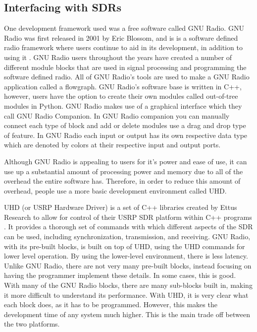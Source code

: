 \subsection{Interfacing with SDRs}
One development framework used was a free software called GNU Radio.  GNU Radio was first released in 2001 by Eric Blossom, and is is a software defined radio framework where users continue to aid in its development, in addition to using it \cite{GNURadioHistory}.
GNU Radio users throughout the years have created a number of different module blocks that are used in signal processing and programming the software defined radio.  All of GNU Radio’s tools are used to make a GNU Radio application called a flowgraph. GNU Radio’s software base is written in C++, however, users have the option to create their own modules called out-of-tree modules in Python.  GNU Radio makes use of a graphical interface which they call GNU Radio Companion.  In GNU Radio companion you can manually connect each type of block and add or delete modules use a drag and drop type of feature.  In GNU Radio each input or output has its own respective data type which are denoted by colors at their respective input and output ports. \par

Although GNU Radio is appealing to users for it's power and ease of use, it can use up a substantial amount of processing power and memory due to all of the overhead the entire software has.  Therefore, in order to reduce this amount of overhead, people use a more basic development environment called UHD.\par

UHD (or USRP Hardware Driver) is a set of C++ libraries created by Ettus Research to allow for control of their USRP SDR platform within C++ programs \cite{uhd_manual}.
It provides a thorough set of commands with which different aspects of the SDR can be used, including synchronization, transmission, and receiving.  GNU Radio, with its pre-built blocks, is built on top of UHD, using the UHD commands for lower level operation. By using the lower-level environment, there is less latency. Unlike GNU Radio, there are not very many pre-built blocks, instead focusing on having the programmer implement these details. In some cases, this is good. With many of the GNU Radio blocks, there are many sub-blocks built in, making it more difficult to understand its performance. With UHD, it is very clear what each block does, as it has to be programmed. However, this makes the development time of any system much higher. This is the main trade off between the two platforms.

